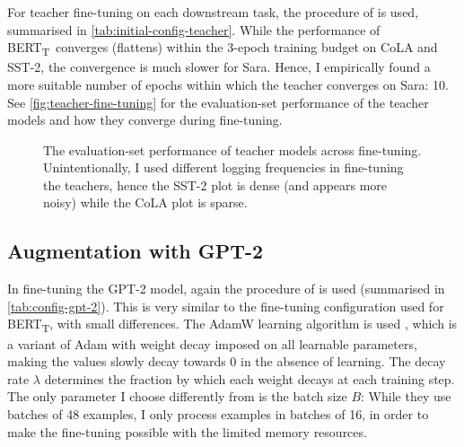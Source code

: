 \documentclass[bsc,frontabs,singlespacing,parskip,deptreport]{infthesis}
\def\BERTT{BERT\textsubscript{T}}
\begin{document}
{{{      For teacher fine-tuning on each downstream task, the procedure of \citeauthor{Tang_2019b} is used, summarised in \autoref{tab:initial-config-teacher}.
      While the performance of \BERTT~converges (flattens) within the 3-epoch training budget on CoLA and SST-2, the convergence is much slower for Sara. Hence, I empirically found a more suitable number of epochs within which the teacher converges on Sara: 10. See \autoref{fig:teacher-fine-tuning} for the evaluation-set performance of the teacher models and how they converge during fine-tuning.
      \begin{figure}[h!t]
        \centering
        \caption{The evaluation-set performance of teacher models across fine-tuning. Unintentionally, I used different logging frequencies in fine-tuning the teachers, hence the SST-2 plot is dense (and appears more noisy) while the CoLA plot is sparse.}
        \label{fig:teacher-fine-tuning}
      \end{figure}
    }

    \subsection{Augmentation with GPT-2}{
      In fine-tuning the GPT-2 model, again the procedure of \citeauthor{Tang_2019b} is used (summarised in \autoref{tab:config-gpt-2}). This is very similar to the fine-tuning configuration used for \BERTT, with small differences. The AdamW learning algorithm is used \citep{Loshchilov_2019}, which is a variant of Adam with weight decay imposed on all learnable parameters, making the values slowly decay towards 0 in the absence of learning. The decay rate $\lambda$ determines the fraction by which each weight decays at each training step.
      The only parameter I choose differently from \citeauthor{Tang_2019b} is the batch size $B$: While they use batches of 48 examples, I only process examples in batches of 16, in order to make the fine-tuning possible with the limited memory resources.

}}}
\end{document}
